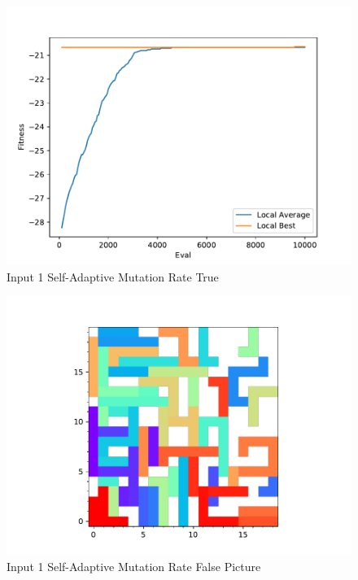 \documentclass[times]{article}
\begin{document}
	\begin{figure}
		\caption{Input 1 Self-Adaptive Mutation Rate True}
		\label{fig:mutTrue}
		\includegraphics[width=\textwidth]{../graphs/graphs/1061}
	\end{figure}

	\begin{figure}
		\caption{Input 1 Self-Adaptive Mutation Rate False Picture}
		\label{fig:mutFalsePicture}
		\includegraphics[width=\textwidth]{../graphs/picture/1059}
	\end{figure}
\end{document}
